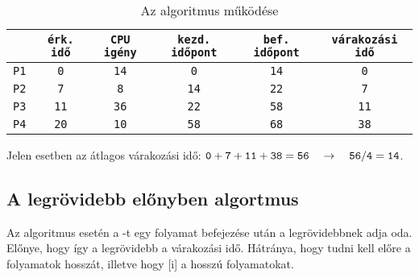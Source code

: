 \documentclass[../main.tex]{subfiles}
\begin{document}
\begin{table}[H]
  \centering
  \begin{tabular}{|c|c|c|c|c|c|}
    \hline
                & \texttt{érk. idő} & \texttt{CPU igény} & \texttt{kezd. időpont} & \texttt{bef. időpont} & \texttt{várakozási idő}
    \\ \hline
    \texttt{P1} & \texttt{0}        & \texttt{14}        & \texttt{0}             & \texttt{14}           & \texttt{0}              \\
    \texttt{P2} & \texttt{7}        & \texttt{8}         & \texttt{14}            & \texttt{22}           & \texttt{7}              \\
    \texttt{P3} & \texttt{11}       & \texttt{36}        & \texttt{22}            & \texttt{58}           & \texttt{11}             \\
    \texttt{P4} & \texttt{20}       & \texttt{10}        & \texttt{58}            & \texttt{68}           & \texttt{38}             \\
    \hline
  \end{tabular}
  \caption{Az  algoritmus működése}
  \label{table:fcfs}
\end{table}

Jelen esetben az átlagos várakozási idő:
$\mathtt{0 + 7 + 11 + 38 = 56}
  \hspace*{1em}\rightarrow\hspace*{1em}
  \mathtt{56/4 = 14}$.

\subsection{A legrövidebb előnyben algortmus}

Az  algoritmus esetén a -t egy folyamat befejezése után a
legrövidebbnek adja oda. Előnye, hogy így a legrövidebb a várakozási idő.
Hátránya, hogy tudni kell előre a folyamatok hosszát, illetve hogy
[i] a hosszú folyamatokat.
\end{document}
